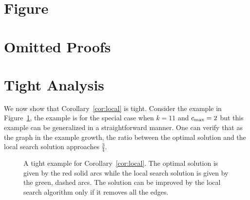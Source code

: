 
\newpage

\section{Figure}




\section{Omitted Proofs}
\label{sec:omitted}


\newpage






\section{Tight Analysis}
\label{sec:tight}

We now show that Corollary~\ref{cor:local} is tight.  Consider the
example in Figure~\ref{fig:local search tight}, the example is for the
special case when $k = 11$ and $c_{\max} = 2$ but this example can be
generalized in a straightforward manner.  One can verify that as the
graph in the example growth, the ratio between the optimal solution
and the local search solution approaches $\frac{3}{4}$.

\begin{figure}[h]
\begin{center}
\scalebox{.9}{

}
\caption{A tight example for Corollary~\ref{cor:local}. 
The optimal solution is given by the red solid arcs while the local
search solution is given by the green, dashed arcs.  The solution can
be improved by the local search algorithm only if it removes all the
edges.}
\label{fig:local search tight}
\end{center}
\end{figure}

